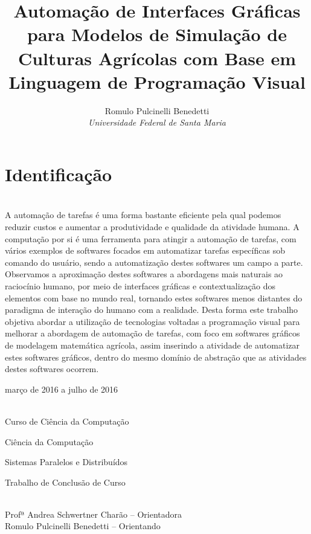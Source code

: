 \documentclass[12pt]{article}
\title{Automação de Interfaces Gráficas para Modelos de Simulação de Culturas Agrícolas com Base em Linguagem de Programação Visual}
\author{Romulo Pulcinelli Benedetti \\ \emph{Universidade Federal de Santa Maria}}
\begin{document}
	\maketitle
	
	\section{Identificação}
	
	\begin{description} \itemsep 0pt
		\item[Resumo:] ~\\
				 
	A automação de tarefas é uma forma bastante eficiente pela qual podemos reduzir custos e aumentar a produtividade e qualidade da atividade humana. A computação por si é uma ferramenta para atingir a automação de tarefas, com vários exemplos de softwares focados em automatizar tarefas específicas sob comando do usuário, sendo a automatização destes softwares um campo a parte. Observamos a aproximação destes softwares a abordagens mais naturais ao raciocínio humano, por meio de interfaces gráficas e contextualização dos elementos com base no mundo real, tornando estes softwares menos distantes do paradigma de interação do humano com a realidade. Desta forma este trabalho objetiva abordar a utilização de tecnologias voltadas a programação visual para melhorar a abordagem de automação de tarefas, com foco em softwares gráficos de modelagem matemática agrícola, assim inserindo a atividade de automatizar estes softwares gráficos, dentro do mesmo domínio de abstração que as atividades destes softwares ocorrem.
		 
		\item[Período de execução:] março de 2016 a julho de 2016
		\item[Unidades participantes:] ~\\ Curso de Ciência da Computação
		\item[Área de conhecimento:] Ciência da Computação
		\item[Linha de Pesquisa:] Sistemas Paralelos e Distribuídos
		\item[Tipo de projeto:] Trabalho de Conclusão de Curso
		\item[Participantes:] ~\\ Profª Andrea Schwertner Charão -- Orientadora \\ Romulo Pulcinelli Benedetti -- Orientando
	\end{description}
	
\end{document}
